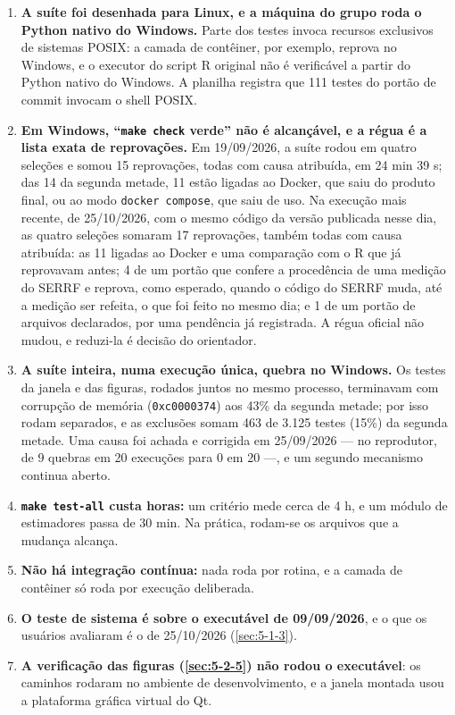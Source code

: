 \begin{enumerate}
\item \textbf{A suíte foi desenhada para Linux, e a máquina do grupo roda o Python nativo do Windows.} Parte dos testes invoca recursos exclusivos de sistemas POSIX: a camada de contêiner, por exemplo, reprova no Windows, e o executor do script R original não é verificável a partir do Python nativo do Windows. A planilha registra que 111 testes do portão de commit invocam o shell POSIX.
\item \textbf{Em Windows, ``\texttt{make check} verde'' não é alcançável, e a régua é a lista exata de reprovações.} Em 19/09/2026, a suíte rodou em quatro seleções e somou 15 reprovações, todas com causa atribuída, em 24 min 39 s; das 14 da segunda metade, 11 estão ligadas ao Docker, que saiu do produto final, ou ao modo \texttt{docker compose}, que saiu de uso. Na execução mais recente, de 25/10/2026, com o mesmo código da versão publicada nesse dia, as quatro seleções somaram 17 reprovações, também todas com causa atribuída: as 11 ligadas ao Docker e uma comparação com o R que já reprovavam antes; 4 de um portão que confere a procedência de uma medição do SERRF e reprova, como esperado, quando o código do SERRF muda, até a medição ser refeita, o que foi feito no mesmo dia; e 1 de um portão de arquivos declarados, por uma pendência já registrada. A régua oficial não mudou, e reduzi-la é decisão do orientador.
\item \textbf{A suíte inteira, numa execução única, quebra no Windows.} Os testes da janela e das figuras, rodados juntos no mesmo processo, terminavam com corrupção de memória (\texttt{0xc0000374}) aos 43\% da segunda metade; por isso rodam separados, e as exclusões somam 463 de 3.125 testes (15\%) da segunda metade. Uma causa foi achada e corrigida em 25/09/2026 --- no reprodutor, de 9 quebras em 20 execuções para 0 em 20 ---, e um segundo mecanismo continua aberto.
\item \textbf{\texttt{make test-\allowbreak{}all} custa horas:} um critério mede cerca de 4 h, e um módulo de estimadores passa de 30 min. Na prática, rodam-se os arquivos que a mudança alcança.
\item \textbf{Não há integração contínua:} nada roda por rotina, e a camada de contêiner só roda por execução deliberada.
\item \textbf{O teste de sistema é sobre o executável de 09/09/2026}, e o que os usuários avaliaram é o de 25/10/2026 (\ref{sec:5-1-3}).
\item \textbf{A verificação das figuras (\ref{sec:5-2-5}) não rodou o executável}: os caminhos rodaram no ambiente de desenvolvimento, e a janela montada usou a plataforma gráfica virtual do Qt.

\end{enumerate}
